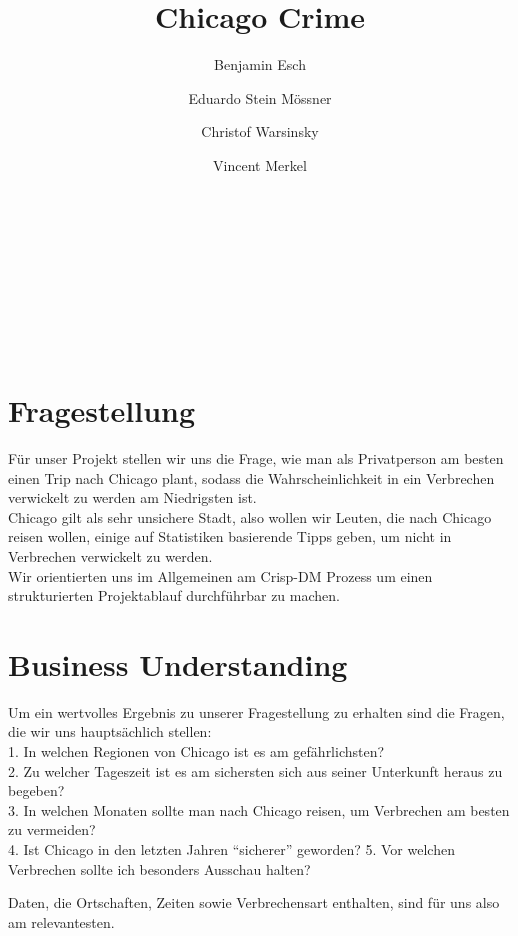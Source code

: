 \documentclass[10pt]{article}
\title{Chicago Crime}
\begin{document}
    \maketitle

    
    {\centering
    \author[1]{Benjamin Esch}\\
    \author[2]{ Eduardo Stein Mössner}\\
    \author[3]{Christof Warsinsky}\\
    \author[4]{Vincent Merkel}\\
    }
    \newpage
    \tableofcontents
    \newpage
    

    
    \section{Fragestellung}\label{fragestellung}

    Für unser Projekt stellen wir uns die Frage, wie man als Privatperson am
besten einen Trip nach Chicago plant, sodass die Wahrscheinlichkeit in
ein Verbrechen verwickelt zu werden am Niedrigsten ist.\\
Chicago gilt als sehr unsichere Stadt, also wollen wir Leuten, die nach
Chicago reisen wollen, einige auf Statistiken basierende Tipps geben, um
nicht in Verbrechen verwickelt zu werden.\\
Wir orientierten uns im Allgemeinen am Crisp-DM Prozess um einen
strukturierten Projektablauf durchführbar zu machen.

    \section{Business Understanding}\label{business-understanding}

    Um ein wertvolles Ergebnis zu unserer Fragestellung zu erhalten sind die
Fragen, die wir uns hauptsächlich stellen:\\
1. In welchen Regionen von Chicago ist es am gefährlichsten?\\
2. Zu welcher Tageszeit ist es am sichersten sich aus seiner Unterkunft
heraus zu begeben?\\
3. In welchen Monaten sollte man nach Chicago reisen, um Verbrechen am
besten zu vermeiden?\\
4. Ist Chicago in den letzten Jahren ``sicherer'' geworden? 5. Vor
welchen Verbrechen sollte ich besonders Ausschau halten?

Daten, die Ortschaften, Zeiten sowie Verbrechensart enthalten, sind für
uns also am relevantesten.
\end{document}
